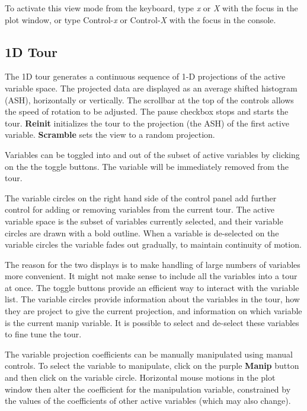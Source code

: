 \documentclass[11pt]{article}
\def\Widget#1{\textbf{#1}}
\begin{document}
To activate this view mode from the keyboard, type {\em x} or {\em X}
with the focus in the plot window, or type Control-{\em x} or
Control-{\em X} with the focus in the console.

\subsection{1D Tour}
\label{slbl:1DTour}

The 1D tour generates a continuous sequence of 1-D projections of the
active variable space. The projected data are displayed as an average
shifted histogram (ASH), horizontally or vertically. The scrollbar at
the top of the controls allows the speed of rotation to be
adjusted. The pause checkbox stops and starts the
tour. \Widget{Reinit} initializes the tour to the projection (the ASH)
of the first active variable.  \Widget{Scramble} sets the view to a
random projection.

Variables can be toggled into and out of the subset of active
variables by clicking on the the toggle buttons. The variable will be
immediately removed from the tour. 

The variable circles on the right hand side of the control panel add
further control for adding or removing variables from the current
tour. The active variable space is the subset of variables currently
selected, and their variable circles are drawn with a bold
outline. When a variable is de-selected on the variable circles the
variable fades out gradually, to maintain continuity of motion.

The reason for the two displays is to make handling of large numbers
of variables more convenient. It might not make sense to include all
the variables into a tour at once. The toggle buttons provide an
efficient way to interact with the variable list. The variable circles
provide information about the variables in the tour, how they are
project to give the current projection, and information on which
variable is the current manip variable. It is possible to select and
de-select these variables to fine tune the tour. 

The variable projection coefficients can be manually manipulated
using manual controls. To select the variable to manipulate, click on
the purple \Widget{Manip} button and then click on the variable circle.
Horizontal mouse motions in the plot window then alter the coefficient for
the manipulation variable, constrained by the values of the coefficients
of other active variables (which may also change).
\end{document}
